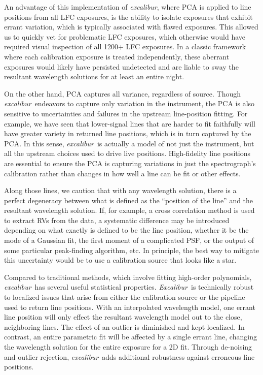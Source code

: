 \documentclass[twocolumn,table,xcolor,trackchanges]{aastex63} %
\newcommand{\project}[1]{\textsl{#1}}
\newcommand{\name}{\project{excalibur}}
\newcommand{\Name}{\project{Excalibur}}
\begin{document}
An advantage of this implementation of \name, where PCA is applied to line positions from all LFC exposures, is the ability to isolate exposures that exhibit errant variation, which is typically associated with flawed exposures.  This allowed us to quickly vet for problematic LFC exposures, which otherwise would have required visual inspection of all 1200+ LFC exposures.  In a classic framework where each calibration exposure is treated independently, these aberrant exposures would likely have persisted undetected and are liable to sway the resultant wavelength solutions for at least an entire night.

On the other hand, PCA captures all variance, regardless of source.  Though \name\ endeavors to capture only variation in the instrument, the PCA is also sensitive to uncertainties and failures in the upstream line-position fitting.  For example, we have seen that lower-signal lines that are harder to fit faithfully will have greater variety in returned line positions, which is in turn captured by the PCA.  In this sense, \name\ is actually a model of not just the instrument, but all the upstream choices used to drive live positions.  High-fidelity line positions are essential to ensure the PCA is capturing variations in just the spectrograph's calibration rather than changes in how well a line can be fit or other effects.

Along those lines, we caution that with any wavelength solution, there is a perfect degeneracy between what is defined as the ``position of the line'' and the resultant wavelength solution.  If, for example, a cross correlation method is used to extract RVs from the data, a systematic difference may be introduced depending on what exactly is defined to be the line position, whether it be the mode of a Gaussian fit, the first moment of a complicated PSF, or the output of some particular peak-finding algorithm, etc.  In principle, the best way to mitigate this uncertainty would be to use a calibration source that looks like a star.

Compared to traditional methods, which involve fitting high-order polynomials, \name\ has several useful statistical properties.  \Name\ is technically robust to localized issues that arise from either the calibration source or the pipeline used to return line positions.  With an interpolated wavelength model, one errant line position will only effect the resultant wavelength model out to the close, neighboring lines.  The effect of an outlier is diminished and kept localized.  In contrast, an entire parametric fit will be affected by a single errant line, changing the wavelength solution for the entire exposure for a 2D fit.  Through de-noising and outlier rejection, \name\ adds additional robustness against erroneous line positions.
\end{document}
